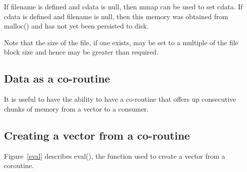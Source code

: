 If filename is defined and cdata is null, then mmap can be used to set cdata. If
cdata is defined and filename is null, then this memory was obtained from
malloc()
and has not yet been persisted to disk.

Note that the size of the file, if one exists, may be set to a
multiple of the file block size and hence may be greater than
required.
\ee

\subsection{Data as a co-routine}
\label{data_coroutine}
It is useful to have the ability to have a co-routine that offers up
consecutive chunks of memory from a vector to a consumer. 


\subsection{Creating a vector from a co-routine}
\label{vec_from_coro}

Figure~\ref{eval} describes eval(), the function used to create a
vector from a coroutine.

